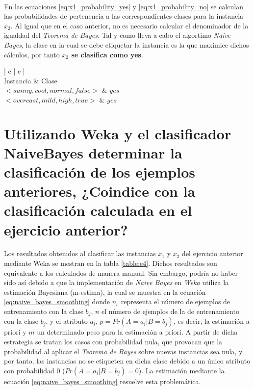 \documentclass{article}
\begin{document}
		\paragraph{}
		En las ecuaciones \eqref{eq:x1_probability_yes} y \eqref{eq:x1_probability_no} se calculan las probabilidades de pertenencia a las correspondientes clases para la instancia $x_2$. Al igual que en el caso anterior, no es necesario calcular el denominador de la igualdad del \emph{Teorema de Bayes}. Tal y como lleva a cabo el algortimo \emph{Naive Bayes}, la clase en la cual se debe etiquetar la instancia es la que maximice dichos cálculos, por tanto \textbf{$x_2$ se clasifica como yes}.

		\begin{table}[H]
			\centering
			\begin{tabu}{ | c | c | }
				\hline
				 \\ \hline
				Instancia	& Clase \\ \hline
				$<sunny, cool, normal, false>$	& $yes$	\\ \hline
				$<overcast, mild, high, true>$	& $yes$	\\
				\hline
			\end{tabu}
			\caption{Clasificación obtenida de manera manual}
			\label{table:e3}
		\end{table}

	\section{Utilizando Weka y el clasificador NaiveBayes determinar la clasificación de los ejemplos anteriores, ¿Coindice con la clasificación calculada en el ejercicio anterior?}
	\label{sec:e4}

		\paragraph{}
		Los resultados obtenidos al clasificar las instancias $x_1$ y $x_2$ del ejercicio anterior mediante Weka se mestran en la tabla \ref{table:e4}. Dichos resultados son equivalente a los calculados de manera manual. Sin embargo, podría no haber sido así debido a que la implementación de \emph{Naive Bayes} en \emph{Weka} utiliza la estimación Bayesiana (m-estima), la cual se muestra en la ecuación \eqref{eq:naive_bayes_smoothing} donde $n_c$ representa el número de ejemplos de entrenamiento con la clase $b_j$, $n$ el número de ejemplos de la de entrenamiento con la clase $b_j$, y el atributo $a_i$, $p = Pr(A = a_i | B = b_j)$, es decir, la estimación a priori y $m$ un determinado peso para la estimación a priori. A partir de dicha estrategia se tratan los casos con probabilidad nula, que provocan que la probabilidad al aplicar el \emph{Teorema de Bayes} sobre nuevas instancias sea nula, y por tanto, las instancias no se etiqueten en dicha clase debido a un único atributo con probabilidad 0 ($Pr(A = a_i | B = b_j)=0$). La estimación mediante la ecuación \eqref{eq:naive_bayes_smoothing} resuelve esta problemática.
\end{document}
